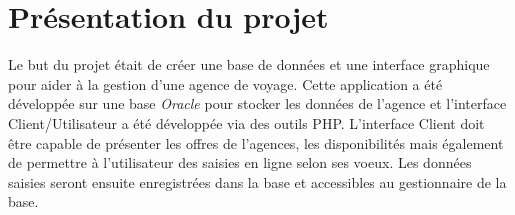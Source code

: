 \section{Pr\'esentation du projet}
Le but du projet \'etait de cr\'eer une base de donn\'ees et une interface graphique pour aider \`a la gestion d'une agence de voyage. Cette application a \'et\'e d\'evelopp\'ee sur une base \textit{Oracle} pour stocker les donn\'ees de l'agence et l'interface Client/Utilisateur a \'et\'e d\'evelopp\'ee via des outils PHP. L'interface Client doit \^etre capable de pr\'esenter les offres de l'agences, les disponibilit\'es mais \'egalement de permettre \`a l'utilisateur des saisies en ligne selon ses voeux. Les donn\'ees saisies seront ensuite enregistr\'ees dans la base et accessibles au gestionnaire de la base.

